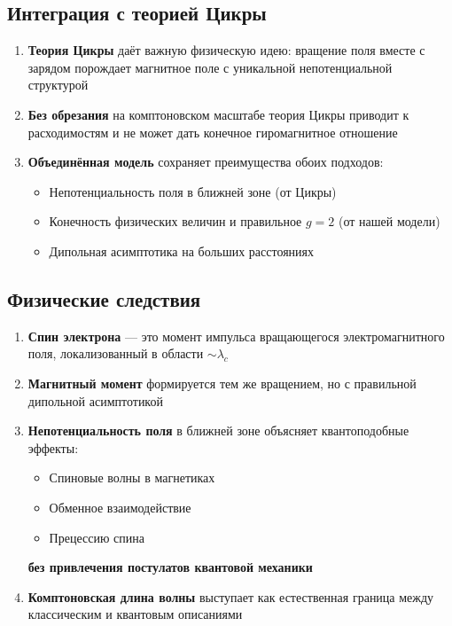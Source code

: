 \documentclass[12pt,a4paper]{article}
\begin{document}
\subsection{Интеграция с теорией Цикры}

\begin{enumerate}
    \item \textbf{Теория Цикры} даёт важную физическую идею: вращение поля вместе с зарядом порождает магнитное поле с уникальной непотенциальной структурой

    \item \textbf{Без обрезания} на комптоновском масштабе теория Цикры приводит к расходимостям и не может дать конечное гиромагнитное отношение

    \item \textbf{Объединённая модель} сохраняет преимущества обоих подходов:
    \begin{itemize}
        \item Непотенциальность поля в ближней зоне (от Цикры)
        \item Конечность физических величин и правильное $g=2$ (от нашей модели)
        \item Дипольная асимптотика на больших расстояниях
    \end{itemize}
\end{enumerate}

\subsection{Физические следствия}

\begin{enumerate}
    \item \textbf{Спин электрона} --- это момент импульса вращающегося электромагнитного поля, локализованный в области $\sim \lambda_c$

    \item \textbf{Магнитный момент} формируется тем же вращением, но с правильной дипольной асимптотикой

    \item \textbf{Непотенциальность поля} в ближней зоне объясняет квантоподобные эффекты:
    \begin{itemize}
        \item Спиновые волны в магнетиках
        \item Обменное взаимодействие
        \item Прецессию спина
    \end{itemize}
    \textbf{без привлечения постулатов квантовой механики}

    \item \textbf{Комптоновская длина волны} выступает как естественная граница между классическим и квантовым описаниями
\end{enumerate}
\end{document}
